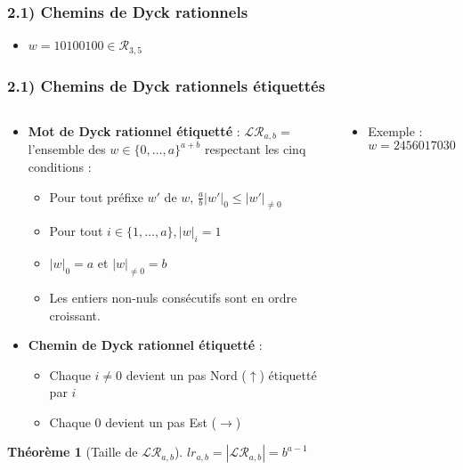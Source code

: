 \documentclass{beamer}
\newtheorem*{thm}{Théorème}
\begin{document}
\begin{frame} %
    \frametitle{2.1) Chemins de Dyck rationnels}
    \begin{itemize}
        \item $w = 10100100 \in \mathcal{R}_{3,5}$
    \end{itemize}
    
\end{frame}

\begin{frame} %
    \fontsize{9}{11}
    \frametitle{2.1) Chemins de Dyck rationnels étiquettés}
    \begin{columns}
        \begin{column}{0.7\textwidth}
            \begin{itemize}
                \item \textbf{Mot de Dyck rationnel étiquetté} : 
                    $\mathcal{LR}_{a,b} =$ l'ensemble des $w \in
                    \{0,\ldots, a\}^{a+b}$ respectant les cinq conditions :
                \begin{itemize}
                    \item Pour tout préfixe $w'$ de $w$, $\frac{a}{b}|w'|_0
                        \leqslant |w'|_{\neq 0}$
                    \item Pour tout $i \in \{1, \ldots, a\}, |w|_i = 1$
                    \item $|w|_0 = a$ et $|w|_{\neq 0} = b$
                    \item Les entiers non-nuls consécutifs sont en ordre
                        croissant.
                \end{itemize}
                \item \textbf{Chemin de Dyck rationnel étiquetté} :
                \begin{itemize}
                    \item Chaque $i \neq 0$ devient un pas Nord ($\uparrow$)
                        étiquetté par $i$
                    \item Chaque 0 devient un pas Est ($\rightarrow$)
                \end{itemize}
            \end{itemize}

            \begin{thm} [Taille de $\mathcal{LR}_{a,b}$]
                $\displaystyle lr_{a,b} = |\mathcal{LR}_{a,b}| = b^{a-1}$
            \end{thm}

        \end{column}
        \begin{column}{0.3\textwidth} 
                \begin{itemize}
                    \item Exemple : $w = 2456017030 \in \mathcal{LR}_{7,3}$
                \end{itemize}
                
        \end{column}
    \end{columns}
\end{frame}
\end{document}
